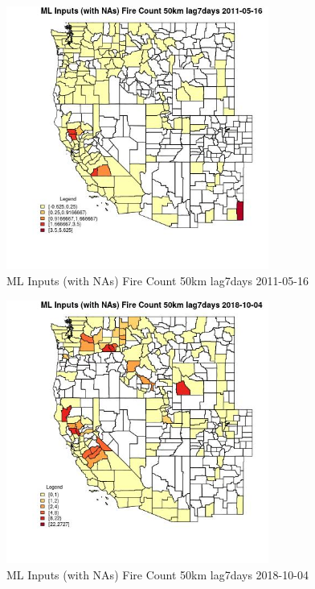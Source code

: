 \begin{figure} 
\centering  
\includegraphics[width=0.77\textwidth]{Code_Outputs/Report_ML_input_PM25_Step4_part_f_de_duplicated_aveswNAs_CountyFire_Count_50km_lag7daysMean2011-05-16.jpg} 
\caption{\label{fig:Report_ML_input_PM25_Step4_part_f_de_duplicated_aveswNAsCountyFire_Count_50km_lag7daysMean2011-05-16}ML Inputs (with NAs) Fire Count 50km lag7days 2011-05-16} 
\end{figure} 
 

\begin{figure} 
\centering  
\includegraphics[width=0.77\textwidth]{Code_Outputs/Report_ML_input_PM25_Step4_part_f_de_duplicated_aveswNAs_CountyFire_Count_50km_lag7daysMean2018-10-04.jpg} 
\caption{\label{fig:Report_ML_input_PM25_Step4_part_f_de_duplicated_aveswNAsCountyFire_Count_50km_lag7daysMean2018-10-04}ML Inputs (with NAs) Fire Count 50km lag7days 2018-10-04} 
\end{figure} 
 

